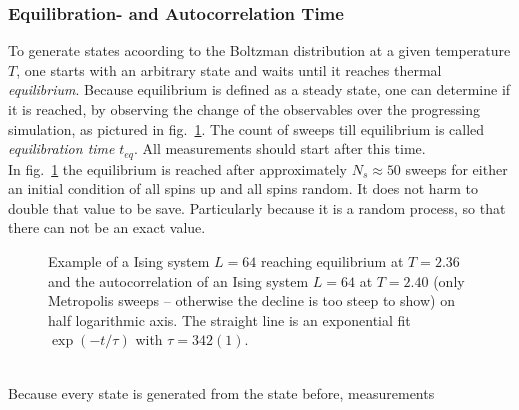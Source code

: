     \subsubsection{Equilibration- and Autocorrelation Time}
    \label{sssec:eqtime}
        To generate states acoording to the Boltzman distribution at a
        given temperature \(T\), one starts with an arbitrary state
        and waits until it reaches thermal \emph{equilibrium}. Because
        equilibrium is defined as a steady state, one can determine if it
        is reached, by observing the change of the observables over the
        progressing simulation, as pictured in fig.\ \ref{fig:equiandauto}.
        The count of sweeps till
        equilibrium is called \emph{equilibration time} \(t_{eq}\).
        All measurements should start after this time.\\
        In fig.\ \ref{fig:equiandauto}
        the equilibrium is reached after approximately \(N_{s} \approx 50\) sweeps for
        either an initial condition of all spins up and all spins random. It
        does not harm to double that value to be save. Particularly because
        it is a random process, so that there can not be an exact value.
        \begin{figure}[htbp]
            \centering
            \caption[Examples for Equilibration and Autocorrelation]
            {
                 Example of a Ising system
                    \(L=64\) reaching equilibrium at \(T=2.36\) and
                 the autocorrelation of an
                    Ising system \(L=64\) at \(T=2.40\) (only Metropolis
                    sweeps -- otherwise the decline is too steep to show)
                    on half logarithmic axis.
                    The straight line is an exponential fit \(\exp(-t/\tau)\)
                    with \(\tau = 342(1)\).
            }
            \label{fig:equiandauto}
        \end{figure}\\
        Because every state is generated from the state before, measurements

